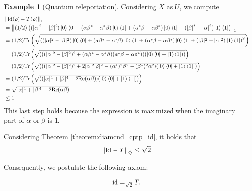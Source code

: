 \documentclass[10pt,a4paper]{amsart}
\theoremstyle{definition}
\theoremstyle{definition}
\newtheorem{example}[definition]{Example}
\theoremstyle{definition}
\theoremstyle{definition}
\theoremstyle{definition}
\theoremstyle{definition}
\begin{document}
\begin{example}[Quantum teleportation]
Considering $X$ as $U$, we compute
\begin{align*}
  &\left\lVert  \mathrm{id}(\rho) - T(\rho) \right\rVert_{1} \\
  & = \left\lVert  (1/2) \left( (|\alpha|^2 -|\beta|^2) \ket{0}\bra{0} + (\alpha \beta^*-\alpha^* \beta)\ket{0}\bra{1} + (\alpha^* \beta-\alpha \beta^*)\ket{0}\bra{1} + (|\beta|^2 -|\alpha|^2 )\ket{1}\bra{1}   \right) \right\rVert_{1} \\
  & = (1/2) \text{Tr} \left( \sqrt{\left( (|\alpha|^2 -|\beta|^2) \ket{0}\bra{0} + (\alpha \beta^*-\alpha^* \beta)\ket{0}\bra{1} + (\alpha^* \beta-\alpha \beta^*)\ket{0}\bra{1} + (|\beta|^2 -|\alpha|^2 )\ket{1}\bra{1}   \right)^2}\right) \\
  & = (1/2) \text{Tr} \left( \sqrt{\left( ((|\alpha|^2 -|\beta|^2 )^2 + (\alpha \beta^*-\alpha^* \beta)(\alpha^* \beta-\alpha \beta^*))  (\ket{0}\bra{0} + \ket{1}\bra{1})  \right)}\right)  \\
  & = (1/2) \text{Tr} \left( \sqrt{\left( ((|\alpha|^2 -|\beta|^2 )^2 + 2|\alpha|^2|\beta|^2 - (\alpha^{*})^{2}\beta^2 -  (\beta^{*})^{2}\alpha^2 )  (\ket{0}\bra{0} + \ket{1}\bra{1})  \right)}\right) \\
  & = (1/2) \text{Tr} \left( \sqrt{\left( (|\alpha|^4+ |\beta|^4 - 2 \text{Re}(\alpha \beta) )  (\ket{0}\bra{0} + \ket{1}\bra{1})  \right)}\right) \\
  & =  \sqrt{|\alpha|^4+ |\beta|^4 - 2 \text{Re}(\alpha \beta)} \\
  & \leq 1
\end{align*}
This last step holds because the expression is maximized when the imaginary part of $\alpha$ or $\beta$ is $1$.

Considering Theorem \ref{theorem:diamond_cptp_id}, it holds that
\begin{align*}
  \left\lVert  \mathrm{id} - T \right\rVert_{\diamondsuit} \leq \sqrt{2}
\end{align*}

Consequently, we postulate the following axiom:

    \begin{align} \label{eq:t_teleport}
        \mathrm{id} =_{ \sqrt{2}} T.
    \end{align}


\end{example}
\end{document}
